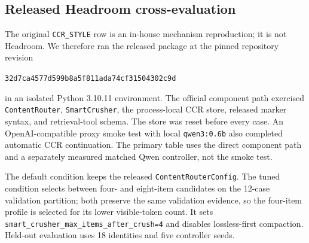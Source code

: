 \documentclass[11pt]{article}
\begin{document}
\subsection{Released Headroom cross-evaluation}

The original \texttt{CCR\_STYLE} row is an in-house mechanism reproduction; it
is not Headroom. We therefore ran the released
 package at the pinned repository revision
\begin{center}
\small\texttt{32d7ca4577d599b8a5f811ada74cf31504302c9d}
\end{center}
in an isolated Python 3.10.11 environment. The official component path exercised
\texttt{ContentRouter}, \texttt{SmartCrusher}, the process-local CCR store,
released marker syntax, and retrieval-tool schema. The store was reset before
every case. An OpenAI-compatible proxy smoke test with local
\texttt{qwen3:0.6b} also completed automatic CCR continuation. The primary
table uses the direct component path and a separately measured matched Qwen
controller, not the smoke test.

The default condition keeps the released \texttt{ContentRouterConfig}. The
tuned condition selects between four- and eight-item candidates on the 12-case
validation partition; both preserve the same validation evidence, so the
four-item profile is selected for its lower visible-token count. It sets
\texttt{smart\_crusher\_max\_items\_after\_crush=4} and disables lossless-first
compaction. Held-out evaluation uses 18 identities and five controller seeds.
\end{document}
